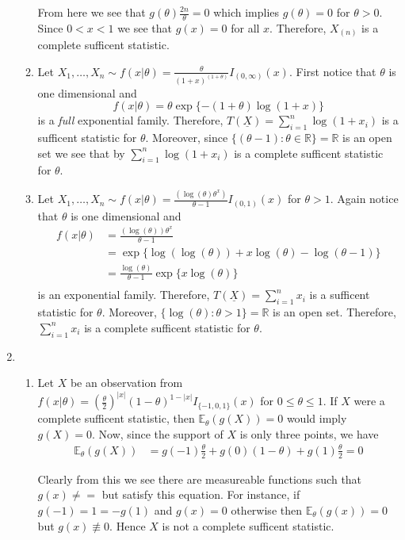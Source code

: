 \documentclass[12pt]{article}  %
\newcommand{\R}{{\mathbb{R}}}
\newcommand{\E}{{\mathbb{E}}}
\begin{document}
\begin{enumerate}
\begin{enumerate}
From here we see that $g(\theta)\frac{2n}{\theta} =0$ which implies $g(\theta) = 0$ for $\theta>0$. Since $0<x<1$ we see that $g(x) = 0$ for all $x$. Therefore, $X_{(n)}$ is a complete sufficent statistic. 

\item Let $X_1, \ldots, X_n\sim f(x|\theta) = \frac{\theta}{(1+x)^{(1+\theta)}}I_{(0,\infty)}(x)$. First notice that $\theta$ is one dimensional and $$f(x|\theta) = \theta \exp\{-(1+\theta)\log(1+x)\}$$ is a \textit{full} exponential family. Therefore, $T(\underline{X}) = \sum_{i=1}^{n}\log(1+x_i)$ is a sufficent statistic for $\theta$. Moreover, since $\{(\theta-1):\theta\in\R\} = \R$ is an open set we see that by $\sum_{i=1}^{n}\log(1+x_i)$ is a complete sufficent statistic for $\theta$. 
\item Let $X_1, \ldots, X_n\sim f(x|\theta) = \frac{(\log(\theta)\theta^x)}{\theta - 1}I_{(0,1)}(x)$ for $\theta >1$. Again notice that $\theta$ is one dimensional and 
\begin{align*}
f(x|\theta) &= \frac{(\log(\theta))\theta^x}{\theta - 1}\\
&= \exp\{\log(\log(\theta)) + x\log(\theta) - \log(\theta-1) \}\\
&= \frac{\log(\theta)}{\theta-1}\exp\{x\log(\theta)\}\\
\end{align*}
is an exponential family. Therefore, $T(\underline{X}) = \sum_{i=1}^nx_i$ is a sufficent statistic for $\theta$. Moreover, $\{\log(\theta): \theta>1\} = \R$ is an open set. Therefore, $\sum_{i=1}^nx_i$ is a complete sufficent statistic for $\theta$. 
\end{enumerate} 

\item 

\begin{enumerate}
\item Let $X$ be an observation from $f(x|\theta) = \left(\frac{\theta}{2}\right)^{|x|}(1-\theta)^{1-|x|}I_{\{-1,0,1\}}(x)$ for $0\leq \theta\leq 1$. If
$X$ were a complete sufficent statistic, then $\E_{\theta}(g(X)) = 0$ would imply $g(X) = 0$. Now, since the support of $X$ is only three points, we have 
\begin{align*}
\E_{\theta}(g(X)) &= g(-1)\frac{\theta}{2} + g(0)(1-\theta) + g(1)\frac{\theta}{2} = 0
\end{align*}

Clearly from this we see there are measureable functions such that $g(x)\neq =$ but satisfy this equation. For instance, if $g(-1) = 1 = -g(1)$ and $g(x) = 0$ otherwise then $\E_{\theta}(g(x)) = 0$ but $g(x)\not\equiv 0$. Hence $X$ is not a complete sufficent statistic. 


\end{enumerate}
\end{enumerate}
\end{document}
